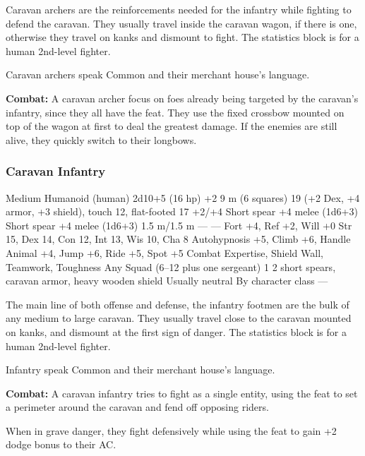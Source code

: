 Caravan archers are the reinforcements needed for the infantry while fighting to defend the caravan. They usually travel inside the caravan wagon, if there is one, otherwise they travel on kanks and dismount to fight. The statistics block is for a human 2nd-level fighter.

Caravan archers speak Common and their merchant house's language.

\textbf{Combat:} A caravan archer focus on foes already being targeted by the caravan's infantry, since they all have the  feat. They use the fixed crossbow mounted on top of the wagon at first to deal the greatest damage. If the enemies are still alive, they quickly switch to their longbows.

\subsubsection{Caravan Infantry}
\begin{MonsterStats}
{Medium Humanoid (human)}
{2d10+5 (16 hp)}
{+2}
{9 m (6 squares)}
{19 (+2 Dex, +4 armor, +3 shield), touch 12, flat-footed 17}
{+2/+4}
{Short spear +4 melee (1d6+3)}
{Short spear +4 melee (1d6+3)}
{1.5 m/1.5 m}
{---}
{---}
{Fort +4, Ref +2, Will +0}
{Str 15, Dex 14, Con 12, Int 13, Wis 10, Cha 8}
{
	Autohypnosis +5,
	Climb +6,
	Handle Animal +4,
	Jump +6,
	Ride +5,
	Spot +5
}
{
	Combat Expertise,
	Shield Wall,
	Teamwork,
	Toughness
}
{Any}
{Squad (6--12 plus one sergeant)}
{1}
{2 short spears, caravan armor, heavy wooden shield}
{Usually neutral}
{By character class}
{---}
\end{MonsterStats}

The main line of both offense and defense, the infantry footmen are the bulk of any medium to large caravan. They usually travel close to the caravan mounted on kanks, and dismount at the first sign of danger. The statistics block is for a human 2nd-level fighter.

Infantry speak Common and their merchant house's language.

\textbf{Combat:} A caravan infantry tries to fight as a single entity, using the  feat to set a perimeter around the caravan and fend off opposing riders.

When in grave danger, they fight defensively while using the  feat to gain +2 dodge bonus to their AC.

